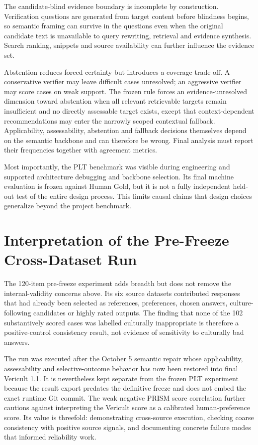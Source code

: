 The candidate-blind evidence boundary is incomplete by construction. Verification questions are generated from target content before blindness begins, so semantic framing can survive in the questions even when the original candidate text is unavailable to query rewriting, retrieval and evidence synthesis. Search ranking, snippets and source availability can further influence the evidence set.

Abstention reduces forced certainty but introduces a coverage trade-off. A conservative verifier may leave difficult cases unresolved; an aggressive verifier may score cases on weak support. The frozen rule forces an evidence-unresolved dimension toward abstention when all relevant retrievable targets remain insufficient and no directly assessable target exists, except that context-dependent recommendations may enter the narrowly scoped contextual fallback. Applicability, assessability, abstention and fallback decisions themselves depend on the semantic backbone and can therefore be wrong. Final analysis must report their frequencies together with agreement metrics.

Most importantly, the PLT benchmark was visible during engineering and supported architecture debugging and backbone selection. Its final machine evaluation is frozen against Human Gold, but it is not a fully independent held-out test of the entire design process. This limits causal claims that design choices generalize beyond the project benchmark.

\section{Interpretation of the Pre-Freeze Cross-Dataset Run}

The 120-item pre-freeze experiment adds breadth but does not remove the internal-validity concerns above. Its six source datasets contributed responses that had already been selected as references, preferences, chosen answers, culture-following candidates or highly rated outputs. The finding that none of the 102 substantively scored cases was labelled culturally inappropriate is therefore a positive-control consistency result, not evidence of sensitivity to culturally bad answers.

The run was executed after the October 5 semantic repair whose applicability, assessability and selective-outcome behavior has now been restored into final Vericult 1.1. It is nevertheless kept separate from the frozen PLT experiment because the result export predates the definitive freeze and does not embed the exact runtime Git commit. The weak negative PRISM score correlation further cautions against interpreting the Vericult score as a calibrated human-preference score. Its value is threefold: demonstrating cross-source execution, checking coarse consistency with positive source signals, and documenting concrete failure modes that informed reliability work.

